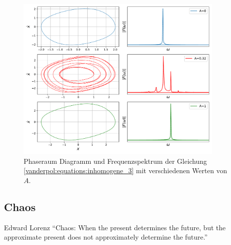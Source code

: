 \begin{figure}
	\centering
	\includegraphics[width=0.9\textwidth]{papers/vanderpol/figures/fft_plot2.pdf}
	\caption{Phaseraum Diagramm und Frequenzspektrum der Gleichung \ref{vanderpol:equations:inhomogene_3} mit verschiedenen Werten von $A$.\label{vanderpol:figures:fft}}
\end{figure}

\subsection{Chaos}
\label{vanderpol:subsection:chaos}

\begin{cquote}[30pt]{Edward Lorenz}
``Chaos: When the present determines the future, but the approximate present does not approximately determine the future.''
\end{cquote}


